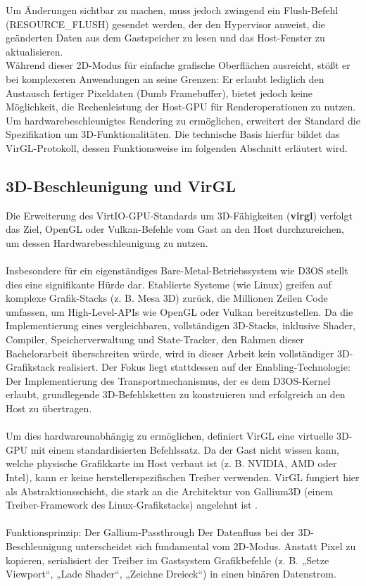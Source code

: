Um Änderungen sichtbar zu machen, muss jedoch zwingend ein Flush-Befehl (RESOURCE\_FLUSH) gesendet werden, der den Hypervisor anweist, die geänderten Daten aus dem Gastspeicher zu lesen und das Host-Fenster zu aktualisieren.\\
Während dieser 2D-Modus für einfache grafische Oberflächen ausreicht, stößt er bei komplexeren Anwendungen an seine Grenzen: Er erlaubt lediglich den Austausch fertiger Pixeldaten (Dumb Framebuffer), bietet jedoch keine Möglichkeit, die Rechenleistung der Host-GPU für Renderoperationen zu nutzen. Um hardwarebeschleunigtes Rendering zu ermöglichen, erweitert der Standard die Spezifikation um 3D-Funktionalitäten. Die technische Basis hierfür bildet das VirGL-Protokoll, dessen Funktionsweise im folgenden Abschnitt erläutert wird.

\subsection{3D-Beschleunigung und VirGL}

Die Erweiterung des VirtIO-GPU-Standards um 3D-Fähigkeiten (\textbf{virgl}) verfolgt das Ziel, OpenGL oder Vulkan-Befehle vom Gast an den Host durchzureichen, um dessen Hardwarebeschleunigung zu nutzen.\\
\\
Insbesondere für ein eigenständiges Bare-Metal-Betriebssystem wie D3OS stellt dies eine signifikante Hürde dar. Etablierte Systeme (wie Linux) greifen auf komplexe Grafik-Stacks (z. B. Mesa 3D) zurück, die Millionen Zeilen Code umfassen, um High-Level-APIs wie OpenGL oder Vulkan bereitzustellen. Da die Implementierung eines vergleichbaren, vollständigen 3D-Stacks, inklusive Shader, Compiler, Speicherverwaltung und State-Tracker, den Rahmen dieser Bachelorarbeit überschreiten würde, wird in dieser Arbeit kein vollständiger 3D-Grafikstack realisiert. Der Fokus liegt stattdessen auf der Enabling-Technologie: Der Implementierung des Transportmechanismus, der es dem D3OS-Kernel erlaubt, grundlegende 3D-Befehlsketten zu konstruieren und erfolgreich an den Host zu übertragen.\\
\\
Um dies hardwareunabhängig zu ermöglichen, definiert VirGL eine virtuelle 3D-GPU mit einem standardisierten Befehlssatz. Da der Gast nicht wissen kann, welche physische Grafikkarte im Host verbaut ist (z. B. NVIDIA, AMD oder Intel), kann er keine herstellerspezifischen Treiber verwenden. VirGL fungiert hier als Abstraktionsschicht, die stark an die Architektur von Gallium3D (einem Treiber-Framework des Linux-Grafikstacks) angelehnt ist \cite{MesaVirGL}.\\
\\
Funktionsprinzip: Der Gallium-Passthrough Der Datenfluss bei der 3D-Beschleunigung unterscheidet sich fundamental vom 2D-Modus. Anstatt Pixel zu kopieren, serialisiert der Treiber im Gastsystem Grafikbefehle (z. B. „Setze Viewport“, „Lade Shader“, „Zeichne Dreieck“) in einen binären Datenstrom.

